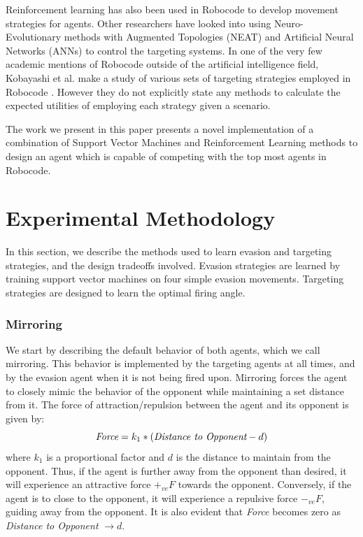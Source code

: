 \documentclass{article}
\theoremstyle{plain}
\theoremstyle{definition}
\theoremstyle{remark}
\begin{document}
Reinforcement learning has also been used in Robocode to develop movement strategies for agents\cite{gade}. Other researchers have looked into using Neuro-Evolutionary methods with Augmented Topologies (NEAT) and Artificial Neural Networks (ANNs) \cite{nielsenAI} to control the targeting systems. In one of the very few academic mentions of Robocode outside of the artificial intelligence field, Kobayashi et al. make a study of various sets of targeting strategies employed in Robocode \cite{strategies}. However they do not explicitly state any methods to calculate the expected utilities of employing each strategy given a scenario.


The work we present in this paper presents a novel implementation of a combination of Support Vector Machines and Reinforcement Learning methods to design an agent which is capable of competing with the top most agents in Robocode.

\section{Experimental Methodology}
In this section, we describe the methods used to learn evasion and targeting strategies, and the design tradeoffs involved. Evasion strategies are learned by training support vector machines on four simple evasion movements. Targeting strategies are designed to learn the optimal firing angle. 

\subsubsection*{Mirroring}
We start by describing the default behavior of both agents, which we call mirroring. This behavior is implemented by the targeting agents at all times, and by the evasion agent when it is not being fired upon. Mirroring forces the agent to closely mimic the behavior of the opponent while maintaining a set distance from it. The force of attraction/repulsion between the agent and its opponent is given by:
$$\emph{Force} = k_1 * (\emph{Distance to Opponent} - d)$$
where $k_1$ is a proportional factor and $d$ is the distance to maintain from the opponent. Thus, if the agent is further away from the opponent than desired, it will experience an attractive force $+_{ve}F$ towards the opponent. Conversely, if the agent is to close to the opponent, it will experience a repulsive force $-_{ve}F$, guiding away from the opponent. It is also evident that \emph{Force} becomes zero as \emph{Distance to Opponent}  $\rightarrow d$.\\ 
\end{document}
